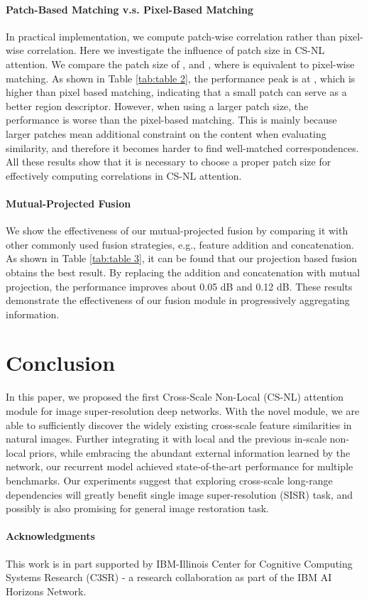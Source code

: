\documentclass[10pt,twocolumn,letterpaper]{article}
\begin{document}
\paragraph{Patch-Based Matching v.s. Pixel-Based Matching} In practical implementation, we compute patch-wise correlation rather than pixel-wise correlation. Here we investigate the influence of patch size  in CS-NL attention. We compare the patch size of ,  and , where  is equivalent to pixel-wise matching. As shown in Table \ref{tab:table 2}, the performance peak is at , which is higher than pixel based matching, indicating that a small patch can serve as a better region descriptor. However, when using a larger patch size, the performance is worse than the pixel-based matching. This is mainly because larger patches mean additional constraint on the content when evaluating similarity, and therefore it becomes harder to find well-matched correspondences. All these results show that it is necessary to choose a proper patch size for effectively computing correlations in CS-NL attention.

\paragraph{Mutual-Projected Fusion} We show the effectiveness of our mutual-projected fusion by comparing it with other commonly used fusion strategies, e.g., feature addition and concatenation. As shown in Table \ref{tab:table 3}, it can be found that our projection based fusion obtains the best result. By replacing the addition and concatenation with mutual projection, the performance improves about 0.05 dB and 0.12 dB. These results demonstrate the effectiveness of our fusion module in progressively aggregating information. 



 \section{Conclusion}
In this paper, we proposed the first Cross-Scale Non-Local (CS-NL) attention module for image super-resolution deep networks. With the novel module, we are able to sufficiently discover the widely existing cross-scale feature similarities in natural images. Further integrating it with local and the previous in-scale non-local priors, while embracing the abundant external information learned by the network, our recurrent model achieved state-of-the-art performance for multiple benchmarks. Our experiments suggest that exploring cross-scale long-range dependencies will greatly benefit single image super-resolution (SISR) task, and possibly is also promising for general image restoration task.  
\paragraph{Acknowledgments}
This work is in part supported by IBM-Illinois Center for Cognitive Computing Systems Research (C3SR) - a research collaboration as part of the IBM AI Horizons Network.


{\small


}
\end{document}

